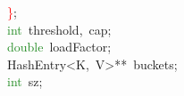 \documentclass[table, usenames,dvipsnames,svgnames]{beamer}
\begin{document}
\begin{frame}
\begin{center}
\begin{minipage}{90mm}
\begin{block}
\mbox{}\ \ \ \ \textcolor{Red}{\}}\textcolor{BrickRed}{;} \\
\mbox{}\ \ \ \ \textcolor{ForestGreen}{int}\ threshold\textcolor{BrickRed}{,}\ cap\textcolor{BrickRed}{;} \\
\mbox{}\ \ \ \ \textcolor{ForestGreen}{double}\ loadFactor\textcolor{BrickRed}{;} \\
\mbox{}\ \ \ \ HashEntry\textcolor{BrickRed}{\textless{}}K\textcolor{BrickRed}{,}\ V\textcolor{BrickRed}{\textgreater{}**}\ buckets\textcolor{BrickRed}{;} \\
\mbox{}\ \ \ \ \textcolor{ForestGreen}{int}\ sz\textcolor{BrickRed}{;}
\end{block}
\end{minipage}\end{center}

\end{frame}
\end{document}
